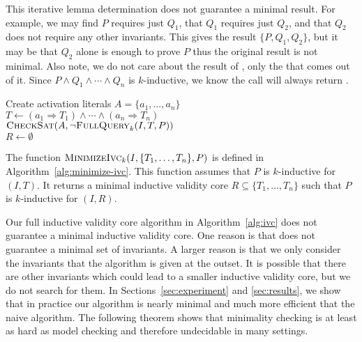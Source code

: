 This iterative lemma determination does not guarantee a minimal
result. For example, we may find $P$ requires just $Q_1$, that $Q_1$
requires just $Q_2$, and that $Q_2$ does not require any other
invariants. This gives the result $\{P, Q_1, Q_2\}$, but it may be
that $Q_2$ alone is enough to prove $P$ thus the original result is
not minimal. Also note, we do not care about the result of \checksat,
only the \unsatcore that comes out of it. Since $P \land Q_1 \land
\cdots \land Q_n$ is $k$-inductive, we know the \checksat call will
always return \unsat.

\begin{algorithm}[t]
  Create activation literals $A = \{a_1, \ldots, a_n\}$ \\
  $T \leftarrow (a_1 \Rightarrow T_1) \land \cdots \land (a_n \Rightarrow T_n)$ \\
  $\textsc{CheckSat}(A, \neg\textsc{FullQuery}_k(I, T, P))$ \\
  $R \leftarrow \emptyset$ \\
\caption{$\minivc_k(I, \{T_1, \ldots, T_n\}, P)$}
\label{alg:minimize-ivc}
\end{algorithm}

The function $\minivc_k(I, \{T_1, \ldots, T_n\}, P)$ is defined in
Algorithm~\ref{alg:minimize-ivc}. This function assumes that $P$ is
$k$-inductive for $(I, T)$. It returns a minimal inductive validity
core $R \subseteq \{T_1, \ldots, T_n\}$ such that $P$ is $k$-inductive
for $(I, R)$.

Our full inductive validity core algorithm in Algorithm~\ref{alg:ivc}
does not guarantee a minimal inductive validity core. One reason is
that \reduceinv does not guarantee a minimal set of invariants. A
larger reason is that we only consider the invariants that the
algorithm is given at the outset. It is possible that there are other
invariants which could lead to a smaller inductive validity core, but
we do not search for them. In Sections~\ref{sec:experiment} and
\ref{sec:results}, we show that in practice our algorithm is nearly
minimal and much more efficient that the naive algorithm. The
following theorem shows that minimality checking is at least as hard
as model checking and therefore undecidable in many settings.

